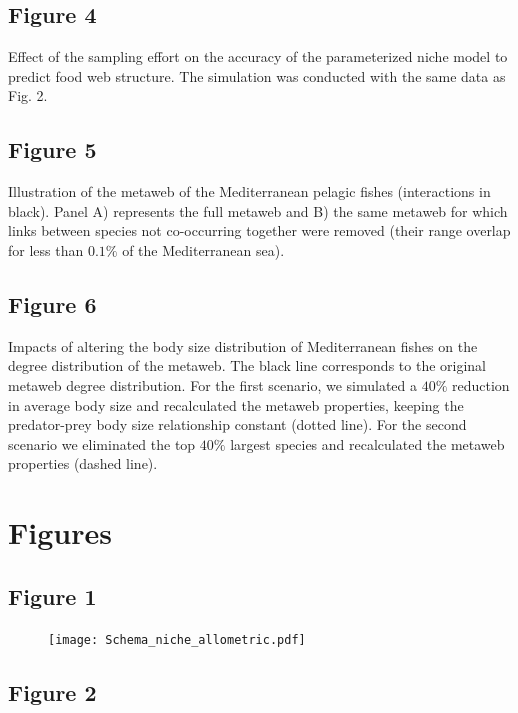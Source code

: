 \documentclass[12pt]{article}
\begin{document}
\subsection*{Figure 4} 
Effect of the sampling effort on the accuracy of the
parameterized niche model to predict food web structure. The simulation was
conducted with the same data as Fig. 2.

\subsection*{Figure 5} 
Illustration of the metaweb of the Mediterranean pelagic
fishes (interactions in black). Panel A) represents the full metaweb and B) the
same metaweb for which links between species not co-occurring together were
removed (their range overlap for less than $0.1\%$ of the Mediterranean sea).

\subsection*{Figure 6} 
Impacts of altering the body size distribution of
Mediterranean fishes on the degree distribution of the metaweb. The black line
corresponds to the original metaweb degree distribution. For the first scenario,
we simulated a $40\%$ reduction in average body size and recalculated the
metaweb properties, keeping the predator-prey body size relationship constant
(dotted line). For the second scenario we eliminated the top $40\%$ largest
species and recalculated the metaweb properties (dashed line).

\newpage
\section*{Figures}

\subsection*{Figure 1}

\begin{figure}[ht!]
	\centering\texttt{[image: Schema\_niche\_allometric.pdf]}
\end{figure}

\newpage
\subsection*{Figure 2}
\end{document}
